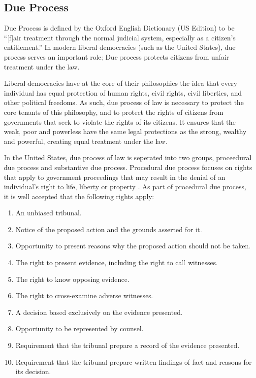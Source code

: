 \documentclass[12pt]{article} %
\newcommand{\hlfixme}[1]{\fxfatal{\hl{#1}}}
\begin{document}
%
%
%
%

\subsection{Due Process} \label{subsec:dueprocess}
Due Process is defined by the Oxford English Dictionary (US Edition) to be ``[f]air treatment through the normal judicial system, especially as a citizen’s entitlement.'' In modern liberal democracies (such as the United States), due process serves an important role; Due process protects citizens from unfair treatment under the law. 

Liberal democracies have at the core of their philosophies the idea that every individual has equal protection of human rights, civil rights, civil liberties, and other political freedoms. As such, due process of law is necessary to protect the core tenants of this philosophy, and to protect the rights of citizens from governments that seek to violate the rights of its citizens. It ensures that the weak, poor and powerless have the same legal protections as the strong, wealthy and powerful, creating equal treatment under the law.

In the United States, due process of law is seperated into two groups, proceedural due process and substantive due process. Procedural due process focuses on rights that apply to government proceedings that may result in the denial of an individual's right to life, liberty or property \cite{wex_procedural}. As part of procedural due process, it is well accepted that the following rights apply: \cite{friendly}

\begin{enumerate}
\item An unbiased tribunal.
\item Notice of the proposed action and the grounds asserted for it.
\item Opportunity to present reasons why the proposed action should not be taken.
\item The right to present evidence, including the right to call witnesses.
\item The right to know opposing evidence.
\item The right to cross-examine adverse witnesses.
\item A decision based exclusively on the evidence presented.
\item Opportunity to be represented by counsel.
\item Requirement that the tribunal prepare a record of the evidence presented.
\item Requirement that the tribunal prepare written findings of fact and reasons for its decision.
\end{enumerate}
\end{document}
